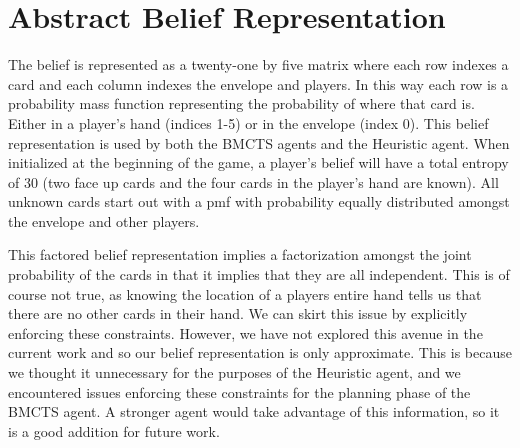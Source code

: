 \documentclass[msc, ai, twoside, notimes, logo, parskip, leftchapter, normalheadings]{infthesis}
\begin{document}
\chapter{Abstract Belief Representation}
The belief is represented as a twenty-one by five matrix where each row indexes a card and each column indexes the envelope and players. In this way each row is a probability mass function representing the probability of where that card is. Either in a player's hand (indices 1-5) or in the envelope (index 0). This belief representation is used by both the BMCTS agents and the Heuristic agent. When initialized at the beginning of the game, a player's belief will have a total entropy of 30 (two face up cards and the four cards in the player's hand are known). All unknown cards start out with a pmf with probability equally distributed amongst the envelope and other players. 

This factored belief representation implies a factorization amongst the joint probability of the cards in that it implies that they are all independent. This is of course not true, as knowing the location of a players entire hand tells us that there are no other cards in their hand. We can skirt this issue by explicitly enforcing these constraints. However, we have not explored this avenue in the current work and so our belief representation is only approximate. This is because we thought it unnecessary for the purposes of the Heuristic agent, and we encountered issues enforcing these constraints for the planning phase of the BMCTS agent. A stronger agent would take advantage of this information, so it is a good addition for future work.

\newpage
\nocite{*}
 

\end{document}
